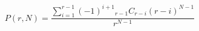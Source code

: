 \documentclass{article}
\begin{document}
\begin{equation}
	P(r,N) = \dfrac{\sum_{i=1}^{r-1}{(-1)^{i+1} {}_{r-1}C_{r-i}(r-i)^{N-1}}}{r^{N-1}}
\end{equation}
\end{document}

